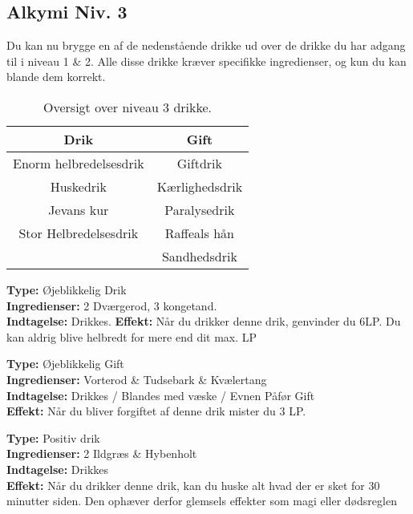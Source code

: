 \subsection*{Alkymi Niv. 3}
Du kan nu brygge en af de nedenstående drikke ud over de drikke du har adgang til i niveau 1 \& 2. Alle disse drikke kræver specifikke ingredienser, og kun du kan blande dem korrekt.\\

\begin{table}[H]
    \centering
    \begin{tabular}{|c|c|}
        \rowcolor{cerulean!80}\hline
        Drik & Gift \\\hline
        Enorm helbredelsesdrik & Giftdrik \\\hline
        Huskedrik &  Kærlighedsdrik \\\hline
        Jevans kur &  Paralysedrik \\\hline
        Stor Helbredelsesdrik & Raffeals hån  \\\hline
         & Sandhedsdrik  \\\hline
    \end{tabular}
    \caption{Oversigt over niveau 3 drikke.}
\end{table}

\begin{drik*}
\textbf{Type:} Øjeblikkelig Drik\\
\textbf{Ingredienser:} 2 Dværgerod, 3 kongetand.\\
\textbf{Indtagelse:} Drikkes.
\textbf{Effekt:} Når du drikker denne drik, genvinder du 6LP. Du kan aldrig blive helbredt for mere end dit max. LP
\end{drik*}

\begin{gift*}[Giftdrik]
\textbf{Type:} Øjeblikkelig Gift \\
\textbf{Ingredienser:} Vorterod \& Tudsebark \& Kvælertang\\
\textbf{Indtagelse:} Drikkes / Blandes med væske / Evnen Påfør Gift\\
\textbf{Effekt:} Når du bliver forgiftet af denne drik mister du 3 LP.\\
\end{gift*}

\begin{drik*}[Huskedrik]
\textbf{Type:} Positiv drik\\
\textbf{Ingredienser:} 2 Ildgræs \& Hybenholt\\
\textbf{Indtagelse:} Drikkes\\
\textbf{Effekt:} Når du drikker denne drik, kan du huske alt hvad der er sket for 30 minutter siden. Den ophæver derfor glemsels effekter som magi eller dødsreglen\\
\end{drik*}

